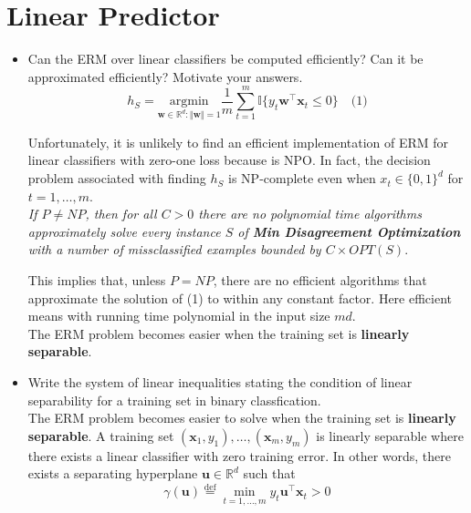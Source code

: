 \newpage
\section{Linear Predictor}

\begin{itemize}

    \item Can the ERM over linear classifiers be computed efficiently? Can it be approximated efficiently? Motivate your answers.\\
       
        $$
        h_{S} = \underset{\boldsymbol{w} \in \mathbb{R}^d : \Vert \boldsymbol{w} \Vert = 1}{\text{argmin}} \frac{1}{m} \sum_{t=1}^{m} \mathbb{I}\{y_t \boldsymbol{w}^{\top}\boldsymbol{x}_t \leq 0\} \quad \text{(1)}
        $$

        Unfortunately, it is unlikely to find an efficient implementation of ERM for linear classifiers with zero-one loss because is NPO. In fact, the decision problem associated with finding $h_{S}$ is NP-complete even when $x_t \in \{0,1\}^d$ for $t = 1, \dots, m$.\\

        \textit{If $P \neq NP$, then for all $C > 0$ there are no polynomial time algorithms approximately solve every instance $S$ of \textbf{Min Disagreement Optimization} with a number of missclassified examples bounded by $C \times OPT(S)$}.

        This implies that, unless $P = NP$, there are no efficient algorithms that approximate the solution of (1) to within any constant factor. Here efficient means with running time polynomial in the input size $md$.\\
        The ERM problem becomes easier when the training set is \textbf{linearly separable}.

    \item Write the system of linear inequalities stating the condition of linear separability for a training set in binary classfication.\\

        The ERM problem becomes easier to solve when the training set is \textbf{linearly separable}. A training set $(\boldsymbol{x}_1 , y_1 ), \dots, (\boldsymbol{x}_m , y_m)$ is linearly separable where there exists a linear classifier with zero training error. In other words, there exists a separating hyperplane $\boldsymbol{u} \in \mathbb{R}^d$ such that
        $$
        \gamma(\boldsymbol{u}) \overset{\text{def}}{=} \min_{t=1, \dots, m} y_t \boldsymbol{u}^{\top}\boldsymbol{x}_t > 0
        $$ 


\end{itemize}
